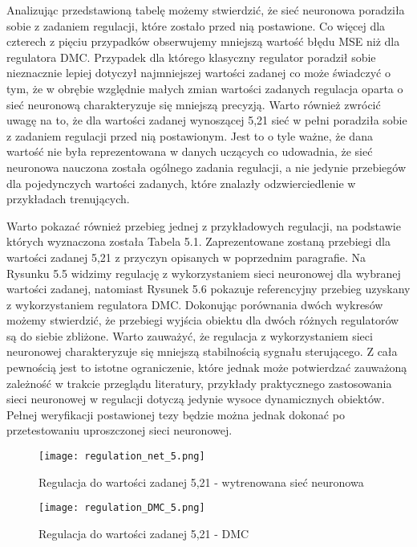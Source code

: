 Analizując przedstawioną tabelę możemy stwierdzić, że sieć neuronowa poradziła sobie z zadaniem regulacji, które zostało przed nią postawione. Co więcej dla czterech z pięciu przypadków obserwujemy mniejszą wartość błędu MSE niż dla regulatora DMC. Przypadek dla którego klasyczny regulator poradził sobie nieznacznie lepiej dotyczył najmniejszej wartości zadanej co może świadczyć o tym, że w obrębie względnie małych zmian wartości zadanych regulacja oparta o sieć neuronową charakteryzuje się mniejszą precyzją. Warto również zwrócić uwagę na to, że dla wartości zadanej wynoszącej 5,21 sieć w pełni poradziła sobie z zadaniem regulacji przed nią postawionym. Jest to o tyle ważne, że dana wartość nie była reprezentowana w danych uczących co udowadnia, że sieć neuronowa nauczona została ogólnego zadania regulacji, a nie jedynie przebiegów dla pojedynczych wartości zadanych, które znalazły odzwierciedlenie w przykładach trenujących. 

\par Warto pokazać również przebieg jednej z przykładowych regulacji, na podstawie których wyznaczona została Tabela 5.1. Zaprezentowane zostaną przebiegi dla wartości zadanej 5,21 z przyczyn opisanych w poprzednim paragrafie. Na Rysunku 5.5 widzimy regulację z wykorzystaniem sieci neuronowej dla wybranej wartości zadanej, natomiast Rysunek 5.6 pokazuje referencyjny przebieg uzyskany z wykorzystaniem regulatora DMC. Dokonując porównania dwóch wykresów możemy stwierdzić, że przebiegi wyjścia obiektu dla dwóch różnych regulatorów są do siebie zbliżone. Warto zauważyć, że regulacja z wykorzystaniem sieci neuronowej charakteryzuje się mniejszą stabilnością sygnału sterującego. Z cała pewnością jest to istotne ograniczenie, które jednak może potwierdzać zauważoną zależność w trakcie przeglądu literatury, przykłady praktycznego zastosowania sieci neuronowej w regulacji dotyczą jedynie wysoce dynamicznych obiektów. Pełnej weryfikacji postawionej tezy będzie można jednak dokonać po przetestowaniu uproszczonej sieci neuronowej.

\begin{figure}[!htb]
  \label{fig:sim-net-5}
  \centering \texttt{[image: regulation\_net\_5.png]}
  \caption{Regulacja do wartości zadanej 5,21 - wytrenowana sieć neuronowa}

  \vspace*{\floatsep}%

  \label{fig:sim-dmc-5}
  \centering \texttt{[image: regulation\_DMC\_5.png]}
  \caption{Regulacja do wartości zadanej 5,21 - DMC}
\end{figure}

